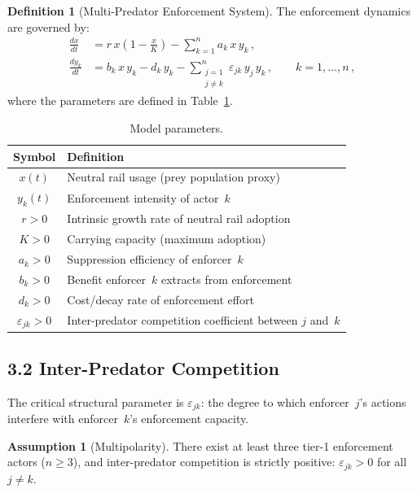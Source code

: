 \documentclass[12pt]{article}
\theoremstyle{definition}
\newtheorem{definition}{Definition}
\newtheorem{assumption}{Assumption}
\theoremstyle{remark}
\begin{document}
\begin{definition}[Multi-Predator Enforcement System]\label{def:system}
The enforcement dynamics are governed by:
\begin{align}
  \frac{dx}{dt} &= r\,x\!\left(1 - \frac{x}{K}\right)
    - \sum_{k=1}^{n} a_k \, x \, y_k \,,
    \label{eq:prey} \\[6pt]
  \frac{dy_k}{dt} &= b_k \, x \, y_k - d_k \, y_k
    - \sum_{\substack{j=1 \\ j \neq k}}^{n}
      \varepsilon_{jk} \, y_j \, y_k \,,
    \qquad k = 1, \ldots, n \,,
    \label{eq:predator}
\end{align}
where the parameters are defined in Table~\ref{tab:params}.
\end{definition}

\begin{table}[h]
\centering
\begin{tabular}{@{}cl@{}}
\toprule
Symbol & Definition \\
\midrule
$x(t)$            & Neutral rail usage (prey population proxy) \\
$y_k(t)$          & Enforcement intensity of actor~$k$ \\
$r > 0$           & Intrinsic growth rate of neutral rail adoption \\
$K > 0$           & Carrying capacity (maximum adoption) \\
$a_k > 0$         & Suppression efficiency of enforcer~$k$ \\
$b_k > 0$         & Benefit enforcer~$k$ extracts from enforcement \\
$d_k > 0$         & Cost/decay rate of enforcement effort \\
$\varepsilon_{jk} > 0$ & Inter-predator competition coefficient between $j$ and~$k$ \\
\bottomrule
\end{tabular}
\caption{Model parameters.}
\label{tab:params}
\end{table}

\subsection{3.2 Inter-Predator Competition}

The critical structural parameter is $\varepsilon_{jk}$: the degree to
which enforcer~$j$'s actions interfere with enforcer~$k$'s enforcement
capacity.

\begin{assumption}[Multipolarity]\label{asm:multi}
There exist at least three tier-1 enforcement actors ($n \geq 3$), and
inter-predator competition is strictly positive:
$\varepsilon_{jk} > 0$ for all $j \neq k$.
\end{assumption}
\end{document}
